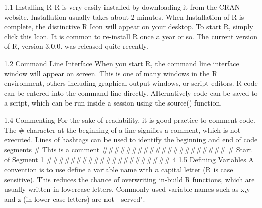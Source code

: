 1.1 Installing R
R is very easily installed by downloading it from the CRAN website. Installation usually takes
about 2 minutes. When Installation of R is complete, the distinctive R Icon will appear on your
desktop. To start R, simply click this Icon. It is common to re-install R once a year or so. The
current version of R, version 3.0.0. was released quite recently.

1.2 Command Line Interface
When you start R, the command line interface window will appear on screen. This is one
of many windows in the R environment, others including graphical output windows, or script
editors. R code can be entered into the command line directly. Alternatively code can be saved
to a script, which can be run inside a session using the source() function.


1.4 Commenting
For the sake of readability, it is good practice to comment code. The # character at the
beginning of a line signifies a comment, which is not executed. Lines of hashtags can be used
to identify the beginning and end of code segments
# This is a comment
#####################
# Start of Segment 1
#####################
4
1.5 Defining Variables
A convention is to use define a variable name with a capital letter (R is case sensitive). This
reduces the chance of overwriting in-build R functions, which are usually written in lowercase
letters. Commonly used variable names such as x,y and z (in lower case letters) are not \re-
served".
